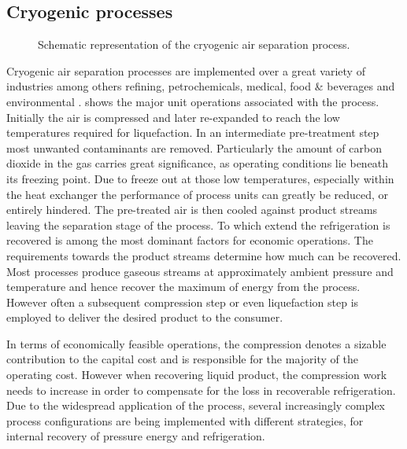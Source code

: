         \subsection{Cryogenic processes}
        \label{sec:cryo_air_sep}

        \begin{figure}
            \center
            
            \caption[Air Separation Unit]{Schematic representation of the cryogenic air separation process.}
            \label{fig:ASU}
        \end{figure}
        Cryogenic air separation processes are implemented over a great variety of industries among others refining,
        petrochemicals, medical, food \& beverages and environmental \cite{Sirdeshpande.2005}. 
        shows the major unit operations associated with the process. Initially the air is compressed and later re-expanded
        to reach the low temperatures required for liquefaction. In an intermediate pre-treatment step most unwanted
        contaminants are removed. Particularly the amount of carbon dioxide in the gas carries great significance, as
        operating conditions lie beneath its freezing point. Due to freeze out at those low temperatures, especially
        within the heat exchanger the performance of process units can greatly be reduced, or entirely hindered.
        The pre-treated air is then cooled against product streams leaving the separation stage of the process. To which extend
        the refrigeration is  recovered is among the most dominant factors for economic operations. The requirements
        towards the product streams determine how much can be recovered. Most processes produce gaseous streams at
        approximately ambient pressure and temperature \cite{Smith.2001} and hence recover the maximum of energy from the
        process. However often a subsequent compression step or even liquefaction step is employed to deliver the
        desired product to the consumer.

        In terms of economically feasible operations, the compression denotes a sizable contribution to the capital cost
        and is responsible for the majority of the operating cost. However when recovering liquid product, the
        compression work needs to increase in order to compensate for the loss in recoverable refrigeration. Due to the widespread
        application of the  process, several increasingly complex process configurations are being implemented
        with different strategies, for internal recovery of pressure energy and refrigeration.

